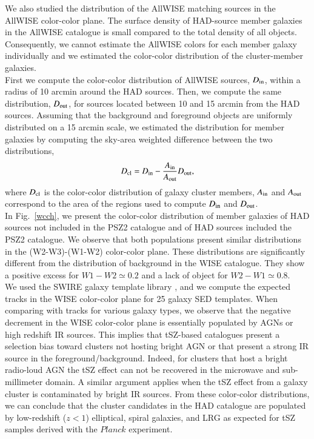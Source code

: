\documentclass[traditabstract,a4,twocolumn]{aa}
\begin{document}
We also studied the distribution of the AllWISE matching sources in
the AllWISE color-color plane.  The surface density of HAD-source
member galaxies in the AllWISE catalogue is small compared to the total
density of all objects. Consequently, we cannot estimate the AllWISE
colors for each member galaxy individually and we 
estimated the color-color distribution of the cluster-member
galaxies.\\ First we compute the color-color distribution of AllWISE
sources, $D_{\rm in}$, within a radius of 10 arcmin around the HAD sources. Then, we
compute the same distribution, $D_{\rm out}$, for sources located between 10 and 15
arcmin from the HAD sources. Assuming that the background and
foreground objects are uniformly distributed on a 15 arcmin scale, we
estimated the distribution for member galaxies by computing the
sky-area weighted difference between the two distributions,
 \begin{align}
D_{\rm cl} = D_{\rm in} - \frac{A_{\rm in}}{A_{\rm out}}D_{\rm out},    
\end{align}
where $D_{\rm cl}$ is the color-color distribution of galaxy cluster members, $A_{\rm in}$ and $A_{\rm out}$ correspond to the area of the regions used to compute $D_{\rm in}$ and $D_{\rm out}$.\\


In Fig.~\ref{wcch}, we present the color-color distribution of member
galaxies of HAD sources not included in the PSZ2 catalogue and of HAD sources included the PSZ2 catalogue. We observe that both populations present
similar distributions in the (W2-W3)-(W1-W2) color-color plane. These
distributions are significantly different from the distribution of
background in the WISE catalogue.  They show a positive excess
for $W1-W2 \simeq 0.2$ and a lack of object for $W2-W1 \simeq 0.8$.\\

We used the SWIRE galaxy template library \citep{pol07}, and we
compute the expected tracks in the WISE color-color plane for 25
galaxy SED templates.  When comparing with tracks for various galaxy
types, we observe that the negative decrement in the WISE color-color
plane is essentially populated by AGNs or high redshift IR
sources. This implies that tSZ-based catalogues present a selection bias
toward clusters not hosting bright AGN or that present a strong
IR source in the foreground/background. Indeed, for clusters that
host a bright radio-loud AGN the tSZ effect can not be recovered in
the microwave and sub-millimeter domain. A similar argument applies
when the tSZ effect from a galaxy cluster is contaminated by bright
IR sources. From these color-color distributions, we can
conclude that the cluster candidates in the HAD catalogue are
populated by low-redshift ($z < 1$) elliptical, spiral galaxies, and
LRG as expected for tSZ samples derived with the $Planck$ experiment.
\end{document}
